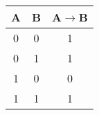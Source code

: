 \begin{tabular}{|c|c||c|}
    \hline
    A & B & A$\rightarrow$B \\\hline
    \hline
    0 & 0 & 1 \\\hline
    0 & 1 & 1 \\\hline
    1 & 0 & 0 \\\hline
    1 & 1 & 1 \\\hline
\end{tabular}